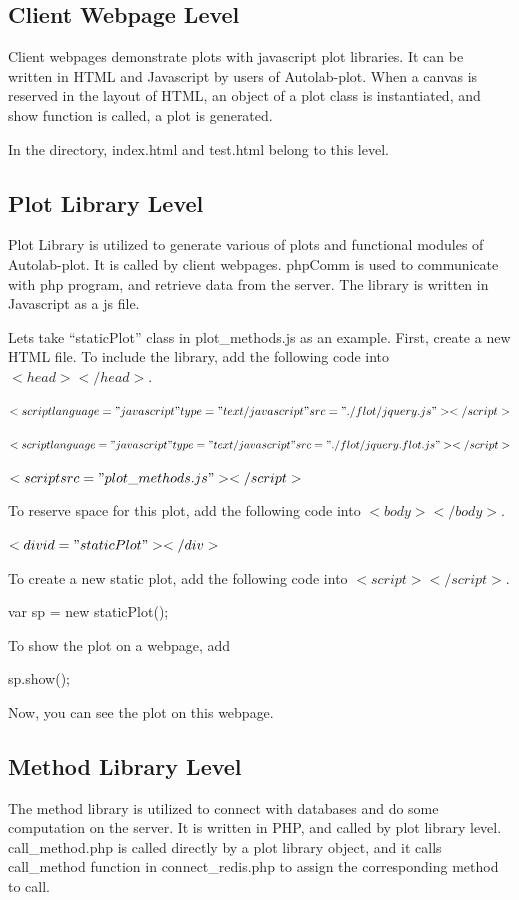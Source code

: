 \documentclass{article}
\begin{document}
\subsection{Client Webpage Level}
Client webpages demonstrate plots with javascript plot libraries.
It can be written in HTML and Javascript by users of Autolab-plot.
When a canvas is reserved in the layout of HTML, an object of a plot class is instantiated, and show function is called, a plot is generated.

In the directory, index.html and test.html belong to this level.

\subsection{Plot Library Level}
Plot Library is utilized to generate various of plots and functional modules of Autolab-plot.
It is called by client webpages.
phpComm is used to communicate with php program, and retrieve data from the server.
The library is written in Javascript as a js file.

Lets take ``staticPlot'' class in plot\_methods.js as an example.
First, create a new HTML file.
To include the library, add the following code into $<head></head>$.

$<script language="javascript" type="text/javascript" src="./flot/jquery.js"></script>$

$<script language="javascript" type="text/javascript" src="./flot/jquery.flot.js"></script>$

$<script src="plot\_methods.js"></script>$

To reserve space for this plot, add the following code into $<body></body>$.

$<div id="staticPlot"></div>$

To create a new static plot, add the following code into $<script></script>$.

var sp = new staticPlot();

To show the plot on a webpage, add

sp.show();

Now, you can see the plot on this webpage.

\subsection{Method Library Level}
The method library is utilized to connect with databases and do some computation on the server.
It is written in PHP, and called by plot library level.
call\_method.php is called directly by a plot library object, and it calls call_method function in connect\_redis.php to assign the corresponding method to call.
\end{document}
